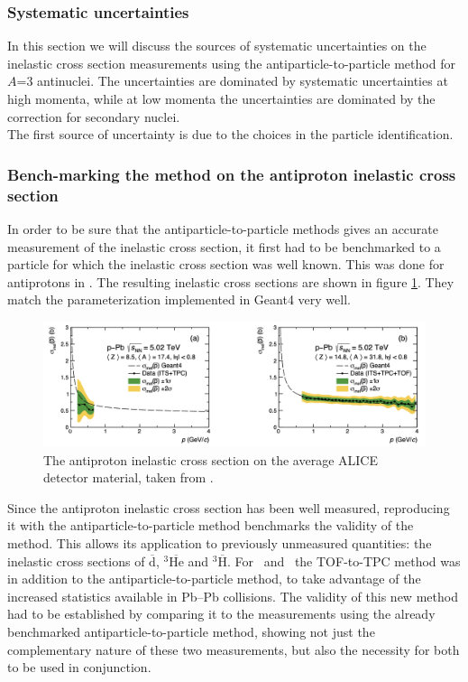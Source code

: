 \subsubsection{Systematic uncertainties}\label{sec:Meth:Systematics}
In this section we will discuss the sources of systematic uncertainties on the inelastic cross section measurements using the antiparticle-to-particle method for $A$=3 antinuclei. The uncertainties are dominated by systematic uncertainties at high momenta, while at low momenta the uncertainties are dominated by the correction for secondary nuclei. \\

The first source of uncertainty is due to the choices in the particle identification. 

\subsubsection{Bench-marking the method on the antiproton inelastic cross section}
In order to be sure that the antiparticle-to-particle methods gives an accurate measurement of the inelastic cross section, it first had to be benchmarked to a particle for which the inelastic cross section was well known. This was done for antiprotons in \cite{antideuteronXS}. The resulting inelastic cross sections are shown in figure \ref{fig:pbar_sigma_inel}. They match the parameterization implemented in Geant4 very well.\\

\begin{figure}
    \centering
    \includegraphics[width=\textwidth]{figures/antiproton_inelastic_xs.png}
    \caption{The antiproton inelastic cross section on the average ALICE detector material, taken from \cite{antideuteronXS}.}
    \label{fig:pbar_sigma_inel}
\end{figure}

Since the antiproton inelastic cross section has been well measured, reproducing it with the antiparticle-to-particle method benchmarks the validity of the method. This allows its application to previously unmeasured quantities: the inelastic cross sections of $\overline{\mathrm{d}}$, $^3\overline{\mathrm{He}}$ and $^3\overline{\mathrm{H}}$. For \ahe\ and \atrit\ the TOF-to-TPC method was in addition to the antiparticle-to-particle method, to take advantage of the increased statistics available in Pb--Pb collisions. The validity of this new method had to be established by comparing it to the measurements using the already benchmarked antiparticle-to-particle method, showing not just the complementary nature of these two measurements, but also the necessity for both to be used in conjunction.
